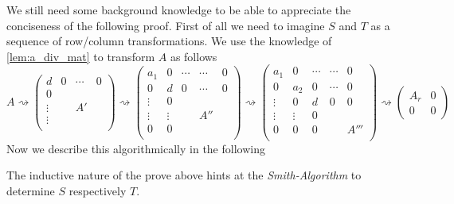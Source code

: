We still need some background knowledge to be able to appreciate the conciseness of the following proof.
First of all we need to imagine \(S\) and \(T\) as a sequence of row/column transformations.
We use the knowledge of \cref{lem:a_div_mat} to transform \(A\) as follows
\[A \rightsquigarrow \left(\begin{array}{c|ccc}
         d      & 0 & \cdots & 0 \\
   \hline
         0      &   &        & \\
         \vdots &   & A'     & \\
         \vdots &   &        & \\
\end{array}\right) \rightsquigarrow \left(\begin{array}{cc|ccc}
         a_1    & 0      & \cdots & \cdots & 0 \\
         0      & d      & 0      & \cdots & 0 \\
         \hline
         \vdots & 0      &        &     & \\
         \vdots & \vdots &        & A'' & \\
         0      & 0      &        &     & \\
\end{array}\right) \rightsquigarrow \left(\begin{array}{ccc|cc}
         a_1    & 0      & \cdots & \cdots & 0 \\
         0      & a_2    & 0      & \cdots & 0 \\
         \vdots & 0      & d      & 0  & 0 \\
         \hline
         \vdots & \vdots & 0      &    & \\
         0      & 0      & 0      &    & A''' \\
\end{array}\right) \rightsquigarrow \left(\begin{array}{c|c} A_r & 0\\ \hline 0 & 0 \end{array}\right)\]
Now we describe this algorithmically in the following

\begin{remark}
   The inductive nature of the prove above hints at the \emph{Smith-Algorithm} to determine \(S\) respectively \(T\).
\end{remark}

